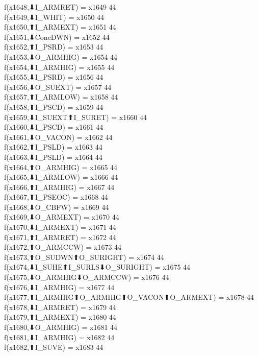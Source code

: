 f(x1648,⬇I_ARMRET) = x1649 {44} \\
f(x1649,⬇I_WHIT) = x1650 {44} \\
f(x1650,⬆I_ARMEXT) = x1651 {44} \\
f(x1651,⬇ConcDWN) = x1652 {44} \\
f(x1652,⬆I_PSRD) = x1653 {44} \\
f(x1653,⬇O_ARMHIG) = x1654 {44} \\
f(x1654,⬇I_ARMHIG) = x1655 {44} \\
f(x1655,⬇I_PSRD) = x1656 {44} \\
f(x1656,⬇O_SUEXT) = x1657 {44} \\
f(x1657,⬆I_ARMLOW) = x1658 {44} \\
f(x1658,⬆I_PSCD) = x1659 {44} \\
f(x1659,⬇I_SUEXT⬆I_SURET) = x1660 {44} \\
f(x1660,⬇I_PSCD) = x1661 {44} \\
f(x1661,⬇O_VACON) = x1662 {44} \\
f(x1662,⬆I_PSLD) = x1663 {44} \\
f(x1663,⬇I_PSLD) = x1664 {44} \\
f(x1664,⬆O_ARMHIG) = x1665 {44} \\
f(x1665,⬇I_ARMLOW) = x1666 {44} \\
f(x1666,⬆I_ARMHIG) = x1667 {44} \\
f(x1667,⬆I_PSEOC) = x1668 {44} \\
f(x1668,⬇O_CBFW) = x1669 {44} \\
f(x1669,⬇O_ARMEXT) = x1670 {44} \\
f(x1670,⬇I_ARMEXT) = x1671 {44} \\
f(x1671,⬆I_ARMRET) = x1672 {44} \\
f(x1672,⬆O_ARMCCW) = x1673 {44} \\
f(x1673,⬆O_SUDWN⬆O_SURIGHT) = x1674 {44} \\
f(x1674,⬇I_SUHE⬆I_SURLS⬇O_SURIGHT) = x1675 {44} \\
f(x1675,⬇O_ARMHIG⬇O_ARMCCW) = x1676 {44} \\
f(x1676,⬇I_ARMHIG) = x1677 {44} \\
f(x1677,⬆I_ARMHIG⬆O_ARMHIG⬆O_VACON⬆O_ARMEXT) = x1678 {44} \\
f(x1678,⬇I_ARMRET) = x1679 {44} \\
f(x1679,⬆I_ARMEXT) = x1680 {44} \\
f(x1680,⬇O_ARMHIG) = x1681 {44} \\
f(x1681,⬇I_ARMHIG) = x1682 {44} \\
f(x1682,⬆I_SUVE) = x1683 {44} \\
